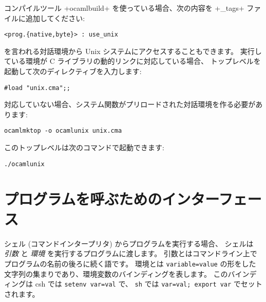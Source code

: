 コンパイルツール \ml+ocamlbuild+ を使っている場合、次の内容を \ml+_tags+ ファイルに追加してください:
%
\begin{lstlisting}
<prog.{native,byte}> : use_unix
\end{lstlisting}
%
 を言われる対話環境から Unix システムにアクセスすることもできます。
実行している環境が C ライブラリの動的リンクに対応している場合、
\ocaml トップレベルを起動して次のディレクティブを入力します:
%
\begin{lstlisting}
#load "unix.cma";;
\end{lstlisting}
%
対応していない場合、システム関数がプリロードされた対話環境を作る必要があります:
%
\begin{lstlisting}
ocamlmktop -o ocamlunix unix.cma
\end{lstlisting}
%
このトップレベルは次のコマンドで起動できます:
\begin{lstlisting}
./ocamlunix
\end{lstlisting}

\section{プログラムを呼ぶためのインターフェース}

シェル (コマンドインタープリタ) からプログラムを実行する場合、
シェルは \emph{引数} と \emph{環境} を実行するプログラムに渡します。
引数とはコマンドライン上でプログラムの名前の後ろに続く語です。
環境とは \texttt{variable=value} の形をした文字列の集まりであり、環境変数のバインディングを表します。
このバインディングは csh では \texttt{setenv var=val} で、 \texttt{sh} では \texttt{var=val; export var}
でセットされます。

